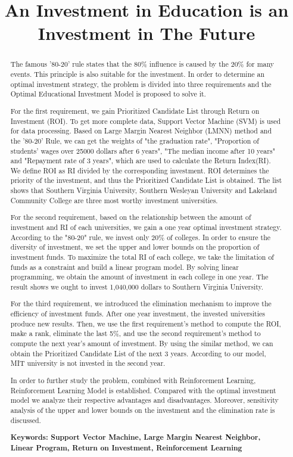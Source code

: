 \documentclass[a4paper,11pt]{article}
\title{An Investment in Education is an Investment in The Future}%
\date{}
\begin{document}
\begin{abstract}
\par The famous '80-20' rule states that the 80\% influence is caused by the 20\% for many events. This principle is also suitable for the investment. In order to determine an optimal investment strategy, the problem is divided into three requirements and the Optimal Educational Investment Model is proposed to solve it.
\par For the first requirement, we gain Prioritized Candidate List through Return on Investment (ROI). To get more complete data, Support Vector Machine (SVM) is used for data processing. Based on Large Margin Nearest Neighbor (LMNN) method and the '80-20' Rule, we can get the weights of "the graduation rate", "Proportion of students' wages over 25000 dollars after 6 years", "The median income after 10 years" and "Repayment rate of 3 years", which are used to calculate the Return Index(RI). We define ROI as RI divided by the corresponding investment. ROI determines the priority of the investment, and thus the Prioritized Candidate List is obtained. The list shows that Southern Virginia University, Southern Wesleyan University and Lakeland Community College are three most worthy investment universities. 
 \par For the second requirement, based on the relationship between the amount of investment and RI of each universities, we gain a one year optimal investment strategy. According to the "80-20" rule, we invest only 20\% of colleges. In order to ensure the diversity of investment, we set the upper and lower bounds on the proportion of investment funds. To maximize the total RI of each college, we take the limitation of funds as a constraint and build a linear program model. By solving linear programming, we obtain the amount of investment in each college in one year. The result shows we ought to invest 1,040,000 dollars to Southern Virginia University.
\par For the third requirement, we introduced the elimination mechanism to improve the efficiency of investment funds. After one year investment, the invested universities produce new results. Then, we use the first requirement's method to compute the ROI, make a rank, eliminate the last 5\%, and use the second requirement's method to compute the next year's amount of investment. By using the similar method, we can obtain the Prioritized Candidate List of the next 3 years. According to our model, MIT university is not invested in the second year.
\par In order to further study the problem, combined with Reinforcement Learning, Reinforcement Learning Model is established. Compared with the optimal investment model we analyze their respective advantages and disadvantages. Moreover, sensitivity analysis of the upper and lower bounds on the investment and the elimination rate is discussed.

\textbf{Keywords: Support Vector Machine, Large Margin Nearest Neighbor, Linear Program, Return on Investment, Reinforcement Learning}



\end{abstract}
\end{document}
